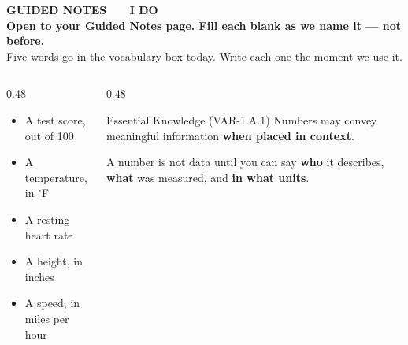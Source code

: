 \documentclass[aspectratio=169, 11pt]{beamer}
\begin{document}
{
\begin{frame}[plain]
  \vspace{1.8cm}\hspace{0.8cm}%
  \begin{minipage}{0.86\textwidth}
    {\color{goldacc}\bfseries\small GUIDED NOTES \ \textbullet\ \ I DO}\\[0.7cm]
    {\color{white}\bfseries\Large Open to your Guided Notes page. Fill each blank as we
    name it --- not before.}\\[0.9cm]
    {\color{skymid}\small Five words go in the vocabulary box today. Write each one the moment
    we use it.}
  \end{minipage}
\end{frame}
}

\begin{frame}[t, plain]
  \begin{columns}[t]
    \begin{column}{0.48\textwidth}
      \begin{itemize}\setlength{\itemsep}{7pt}
        \item A test score, out of 100
        \item A temperature, in $^\circ$F
        \item A resting heart rate
        \item A height, in inches
        \item A speed, in miles per hour
      \end{itemize}
    \end{column}
    \begin{column}{0.48\textwidth}
      \begin{block}{Essential Knowledge (VAR-1.A.1)}
        Numbers may convey meaningful information \textbf{when placed in context}.
      \end{block}
      \vspace{4pt}
      {\small A number is not data until you can say \textbf{who} it describes,
      \textbf{what} was measured, and \textbf{in what units}.}
    \end{column}
  \end{columns}
\end{frame}
\end{document}
